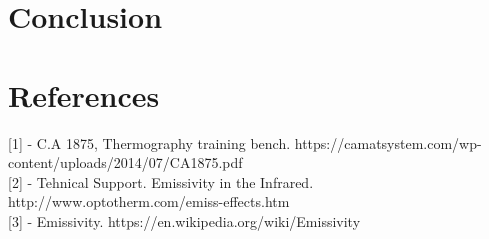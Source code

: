 \documentclass[english]{article}
\begin{document}


\section{Conclusion}
\section{References}
{[}1{]} - C.A 1875, Thermography training bench. https://camatsystem.com/wp-content/uploads/2014/07/CA1875.pdf\\
{[}2{]} - Tehnical Support. Emissivity in the Infrared. http://www.optotherm.com/emiss-effects.htm\\
{[}3{]} - Emissivity. https://en.wikipedia.org/wiki/Emissivity
\end{document}
